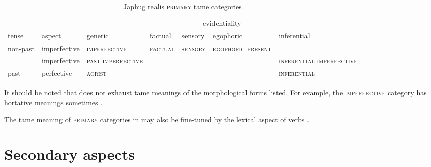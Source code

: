 \documentclass[a4paper, oneside, 12pt]{report}
\newcommand*{\citesec}[1]{\S~{#1}}
\newcommand{\category}[1]{\textsc{#1}}
\begin{document}
\begin{table}[H]
    \centering
    \caption{Japhug realis \category{primary} \acs{tame} categories}
    \label{tbl:realis-tam}
    \scriptsize
    \begin{tabular}{lllllll}
        \toprule
                                &                          & \multicolumn{5}{c}{evidentiality}                                                                                                                                                                        \\ \cmidrule(l){3-7} 
        \multirow{-2}{*}{tense} & \multirow{-2}{*}{aspect} & generic                           & factual                           & sensory                           & egophoric                         & inferential                                              \\ \midrule
        non-past                & imperfective             & \category{imperfective}             & \category{factual}                  & \category{sensory}                  & \category{egophoric present}        & \cellcolor[HTML]{C0C0C0}{\color[HTML]{C0C0C0} \category{}} \\ \midrule
                                & imperfective             & \category{past imperfective}        & \cellcolor[HTML]{C0C0C0}\category{} & \cellcolor[HTML]{C0C0C0}\category{} & \cellcolor[HTML]{C0C0C0}\category{} & \category{inferential imperfective}                                     \\ \cmidrule(l){2-7} 
        \multirow{-2}{*}{past}  & perfective               & \category{aorist} & \cellcolor[HTML]{C0C0C0}\category{} & \cellcolor[HTML]{C0C0C0}\category{} & \cellcolor[HTML]{C0C0C0}\category{} & \category{inferential }                        \\ \bottomrule
    \end{tabular}
\end{table}

It should be noted that  does not exhaust 
\ac{tame} meanings of the morphological forms listed.
For example, the \category{imperfective} category 
has hortative meanings sometimes \citep[\citesec{21.2.5}]{jacques2021grammar}.

The \ac{tame} meaning of \category{primary} categories in  
may also be fine-tuned by the lexical aspect of verbs 
\citep[\citesec{21.2.6}, \citesec{21.2.7}]{jacques2021grammar}.


\section{Secondary aspects}
\end{document}
